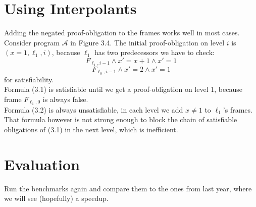 \documentclass{article}
\begin{document}
	\section{Using Interpolants}
	Adding the negated proof-obligation to the frames works well in most cases. Consider program $\mathcal{A}$ in Figure 3.4. The initial proof-obligation on level $i$ is $(x = 1, \ell_1, i)$, because $\ell_1$ has two predecessors we have to check:
	\begin{equation}
	F_{\ell_1, i - 1} \land x' = x + 1 \land x' = 1
	\end{equation}
	\begin{equation}
	F_{\ell_0, i - 1} \land x' = 2 \land x' = 1
	\end{equation}
	for satisfiability. \\
	Formula (3.1) is satisfiable until we get a proof-obligation on level 1, because frame $F_{\ell_1, 0}$ is always false. \\
	Formula (3.2) is always unsatisfiable, in each level we add $x \neq 1$ to $\ell_1$'s frames. That formula however is not strong enough to block the chain of satisfiable obligations of (3.1) in the next level, which is inefficient.
	
	
	
	\section{Evaluation}
	Run the benchmarks again and compare them to the ones from last year, where we will see (hopefully) a speedup.
	
	\pagebreak
	



	
\end{document}
